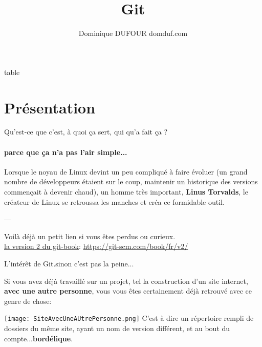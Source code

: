 \documentclass[10pt]{beamer}
\author{Dominique DUFOUR domduf.com}
\title{Git}
\begin{document}
\begin{frame}
\titlepage
\end{frame}

\begin{frame}{table}
\tableofcontents
\end{frame}

\section{Présentation}

\begin{frame}{Qu'est-ce que c'est, à quoi ça sert, qui qu'a fait ça ?}

\framesubtitle{parce que ça n'a pas l'air simple...}

Lorsque le noyau de Linux\cite{noauthor_git_nodate} devint un peu compliqué à faire évoluer (un grand nombre de développeurs étaient sur le coup, maintenir un historique des versions commençait à devenir chaud), un homme très important, \textbf{Linus Torvalds}, le créateur de Linux se retroussa les manches et créa ce formidable outil.

---

Voilà déjà un petit lien si vous êtes perdus ou curieux.
\\

\href{https://git-scm.com/book/fr/v2/}{la version 2 du git-book}: \url{https://git-scm.com/book/fr/v2/}



\end{frame}



\begin{frame}{L'intérêt de Git.}{sinon c'est pas la peine...}

Si vous avez déjà travaillé sur un projet, tel la construction d'un site internet, \textbf{avec une autre personne}, vous vous êtes 
certainement déjà retrouvé avec ce genre de chose:

\texttt{[image: SiteAvecUneAUtrePersonne.png]}
C'est à dire un répertoire rempli de dossiers du même site, ayant un nom de version différent, et au bout du compte...\textbf{bordélique}.

\end{frame}
\end{document}
